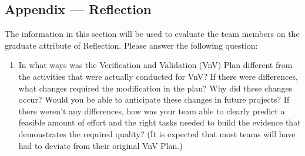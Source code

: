 \documentclass[12pt, titlepage]{article}
\begin{document}
\subsection{Appendix --- Reflection}

The information in this section will be used to evaluate the team members on the
graduate attribute of Reflection.  Please answer the following question:

\begin{enumerate}
  \item In what ways was the Verification and Validation (VnV) Plan different
  from the activities that were actually conducted for VnV?  If there were
  differences, what changes required the modification in the plan?  Why did
  these changes occur?  Would you be able to anticipate these changes in future
  projects?  If there weren't any differences, how was your team able to clearly
  predict a feasible amount of effort and the right tasks needed to build the
  evidence that demonstrates the required quality?  (It is expected that most
  teams will have had to deviate from their original VnV Plan.)
\end{enumerate}
\end{document}

